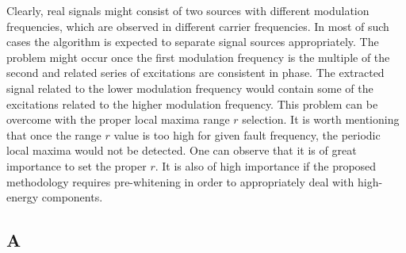 Clearly, real signals might consist of two sources with different modulation frequencies, which are observed in different carrier frequencies. In most of such cases the algorithm is expected to separate signal sources appropriately. The problem might occur once the first modulation frequency is the multiple of the second and related series of excitations are consistent in phase. The extracted signal related to the lower modulation frequency would contain some of the excitations related to the higher modulation frequency. This problem can be overcome with the proper local maxima range $r$ selection. It is worth mentioning that once the range $r$ value is too high for given fault frequency, the periodic local maxima would not be detected. One can observe that it is of great importance to set the proper $r$. It is also of high importance if the proposed methodology requires pre-whitening in order to appropriately deal with high-energy components.
\subsection{A}